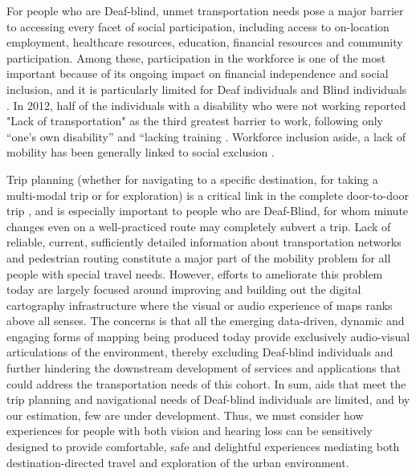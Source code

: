 


For people who are Deaf-blind, unmet transportation needs pose a major barrier to accessing every facet of social participation, including access to on-location employment, healthcare resources, education, financial resources and community participation. 
Among these, participation in the workforce is one of the most important because of its ongoing impact on financial independence and social inclusion, and it is particularly limited for Deaf individuals and Blind individuals \cite{zwerling2002workforce}.  
In 2012, half of the individuals with a disability who were not working reported "Lack of transportation" as the third greatest barrier to work, following only “one’s own disability” and “lacking training \cite{BLS}.
Workforce inclusion aside, a lack of mobility has been generally linked to social exclusion \cite{kenyon2002transport}.


Trip planning (whether for navigating to a specific destination, for taking a multi-modal trip or for exploration) is a critical link in the complete door-to-door trip \cite{AttriCompleteTrip}, and is especially important to people who are Deaf-Blind, for whom minute changes even on a well-practiced route may completely subvert a trip.  Lack of reliable, current, sufficiently detailed information about transportation networks and pedestrian routing constitute a major part of the mobility problem for all people with special travel needs. However, efforts to ameliorate this problem today are largely focused around improving and building out the digital cartography infrastructure where the visual or audio experience of maps ranks above all senses. The concerns is that all the emerging data-driven, dynamic and engaging forms of mapping being produced today provide exclusively audio-visual articulations of the environment, thereby excluding Deaf-blind individuals and further hindering the downstream development of services and applications that could address the transportation needs of this cohort. In sum,  aids that meet the trip planning and navigational needs of Deaf-blind individuals are limited, and by our estimation, few are under development.
Thus, we must consider how experiences for people with both vision and hearing loss can be sensitively designed to provide comfortable, safe and delightful experiences mediating both destination-directed travel and exploration of the urban environment. 

